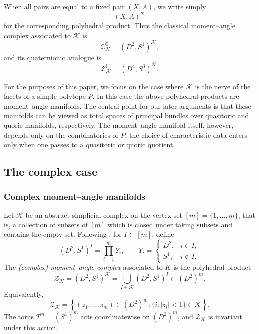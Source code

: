 \documentclass[11pt,a4paper]{article}
\numberwithin{equation}{section}
\theoremstyle{named}
\begin{document}
When all pairs are equal to a fixed pair \((X,A)\), we write simply
\[
    (X,A)^{\mathcal K}
\]
for the corresponding polyhedral product. Thus the classical moment--angle complex associated to \(\mathcal K\) is
\[
    \mathcal Z_{\mathcal K}^{\mathbb C}
    =
    (D^2,S^1)^{\mathcal K},
\]
and its quaternionic analogue is
\[
    \mathcal Z_{\mathcal K}^{\mathbb H}
    =
    (D^4,S^3)^{\mathcal K}.
\]

For the purposes of this paper, we focus on the case where \(\mathcal K\) is the nerve of the facets of a simple polytope \(P\). In this case the above polyhedral products are moment--angle manifolds. The central point for our later arguments is that these manifolds can be viewed as total spaces of principal bundles over quasitoric and quoric manifolds, respectively. The moment--angle manifold itself, however, depends only on the combinatorics of \(P\); the choice of characteristic data enters only when one passes to a quasitoric or quoric quotient.

\subsection{The complex case}
\subsubsection{Complex moment--angle manifolds}
\label{sec:moment_angle_C}

Let \(\mathcal K\) be an abstract simplicial complex on the vertex set \([m]=\{1,\ldots,m\}\), that is, a collection of subsets of \([m]\) which is closed under taking subsets and contains the empty set. Following \cite{bp00}, for \(I\subset [m]\), define
\[
    (D^2,S^1)^I
    =
    \prod_{i=1}^{m}Y_i,
    \qquad
    Y_i=
    \begin{cases}
    D^2, & i\in I,\\
    S^1, & i\notin I.
    \end{cases}
\]
The \emph{(complex) moment--angle complex} associated to \(K\) is the polyhedral product
\[
    \mathcal Z_{\mathcal K}=(D^2,S^1)^{\mathcal K}
    =
    \bigcup_{I\in \mathcal K}(D^2,S^1)^I
    \subset (D^2)^m.
\]
Equivalently,
\[
    \mathcal Z_{\mathcal K}
    =
    \left\{
    (z_1,\ldots,z_m)\in (D^2)^m
    :
    \{i: |z_i|<1\}\in \mathcal K
    \right\}.
\]
The torus \(T^m=(S^1)^m\) acts coordinatewise on \((D^2)^m\), and \(\mathcal Z_{\mathcal K}\) is invariant under this action.
\end{document}
